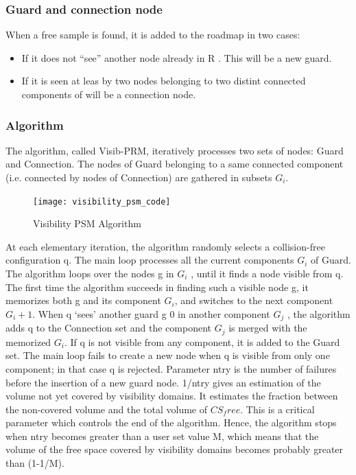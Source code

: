 \documentclass[11pt]{article}
\begin{document}
\subsubsection{Guard and connection node}
When a free sample is found, it is added to the roadmap in two cases:
\begin{itemize}
\item If it does not “see” another node already in R . This will be a new guard.
\item If it is seen at leas by two nodes belonging to two distint connected components of will be a connection node.
\end{itemize}
\subsubsection{Algorithm}
The algorithm, called Visib-PRM, iteratively processes two sets of nodes: Guard
and Connection. The nodes of Guard belonging to a same connected component
(i.e. connected by nodes of Connection) are gathered in subsets $G_i$.

\begin{figure}[h]
\texttt{[image: visibility\_psm\_code]}
\centering
\caption{Visibility PSM Algorithm}
\label{fig:vispsm_alg}
\end{figure}
At each elementary iteration, the algorithm randomly selects a collision-free
configuration q. The main loop processes all the current components $G_i$ of Guard. The algorithm loops over the nodes g in $G_i$ , until it finds a node visible from q. The
first time the algorithm succeeds in finding such a visible node g, it memorizes both
g and its component $G_i$, and switches to the next component $G_i+1$. When q ‘sees’
another guard g
0 in another component $G_j$ , the algorithm adds q to the Connection
set and the component $G_j$ is merged with the memorized $G_i$. If q is not visible from
any component, it is added to the Guard set. The main loop fails to create a new
node when q is visible from only one component; in that case q is rejected.
Parameter ntry is the number of failures before the insertion of a new guard node.
1/ntry gives an estimation of the volume not yet covered by visibility domains.
It estimates the fraction between the non-covered volume and the total volume of
$CS_free$. This is a critical parameter which controls the end of the algorithm. Hence,
the algorithm stops when ntry becomes greater than a user set value M, which
means that the volume of the free space covered by visibility domains becomes
probably greater than (1-1/M).
\end{document}
